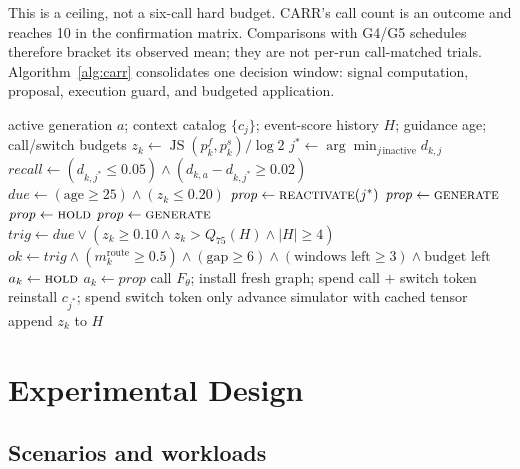 \documentclass[sigconf,anonymous,review]{acmart}
\newcommand{\carr}{\textsc{CARR}}
\begin{document}
This is a ceiling, not a six-call hard budget. \carr's call count is an outcome
and reaches 10 in the confirmation matrix. Comparisons with G4/G5 schedules
therefore bracket its observed mean; they are not per-run call-matched trials.
Algorithm~\ref{alg:carr} consolidates one decision window: signal computation,
proposal, execution guard, and budgeted application.

\begin{algorithm}[t]
\caption{\carr decision at guidance window $k$ (\texttt{context\_memory\_B25}).}
\label{alg:carr}
\begin{algorithmic}[1]
\Require active generation $a$; context catalog $\{c_j\}$; event-score history
  $H$; guidance age; call/switch budgets
\State $z_k \gets \operatorname{JS}(p^f_k,p^s_k)/\log 2$
\State $j^\ast \gets \arg\min_{j\,\text{inactive}} d_{k,j}$
\State $\mathit{recall} \gets (d_{k,j^\ast}\!\le\!0.05)\wedge
  (d_{k,a}\!-\!d_{k,j^\ast}\!\ge\!0.02)$
\State $\mathit{due} \gets (\text{age}\!\ge\!25)\wedge(z_k\!\le\!0.20)$
  \State $\mathit{prop} \gets \textsc{reactivate}(j^\ast)$
  \State $\mathit{prop} \gets \textsc{generate}$
  \State $\mathit{prop} \gets \textsc{hold}$
\Else
  \State $\mathit{prop} \gets \textsc{generate}$
\EndIf
\State $\mathit{trig} \gets \mathit{due} \vee
  (z_k\!\ge\!0.10 \wedge z_k\!>\!Q_{75}(H) \wedge |H|\!\ge\!4)$
\State $\mathit{ok} \gets \mathit{trig} \wedge (m^{\mathrm{route}}_k\!\ge\!0.5)
  \wedge (\text{gap}\!\ge\!6) \wedge (\text{windows left}\!\ge\!3)
  \wedge \text{budget left}$
  \State $a_k \gets \textsc{hold}$
\Else
  \State $a_k \gets \mathit{prop}$
\EndIf
{}
  \State call $F_\theta$; install fresh graph; spend call $+$ switch token
  \State reinstall $c_{j^\ast}$; spend switch token only
\Else
  \State advance simulator with cached tensor
\EndIf
\State append $z_k$ to $H$
\end{algorithmic}
\end{algorithm}

\section{Experimental Design}

\subsection{Scenarios and workloads}
\end{document}
